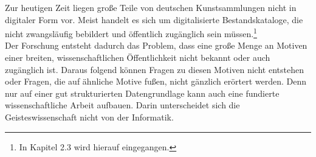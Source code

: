 \documentclass[a4paper,12pt,ngerman]{article}
\begin{document}
Zur heutigen Zeit liegen große Teile von deutschen Kunstsammlungen nicht in digitaler Form vor. Meist handelt es sich um digitalisierte Bestandskataloge, die nicht zwangsläufig bebildert und öffentlich zugänglich sein müssen.\footnote{In Kapitel 2.3 wird hierauf eingegangen.} \\
Der Forschung entsteht dadurch das Problem, dass eine große Menge an Motiven einer breiten, wissenschaftlichen Öffentlichkeit nicht bekannt oder auch zugänglich ist. Daraus folgend können Fragen zu diesen Motiven nicht entstehen oder Fragen, die auf ähnliche Motive fußen, nicht gänzlich erörtert werden. Denn nur auf einer gut strukturierten Datengrundlage kann auch eine fundierte wissenschaftliche Arbeit aufbauen. Darin unterscheidet sich die Geisteswissenschaft nicht von der Informatik. \\
\end{document}
